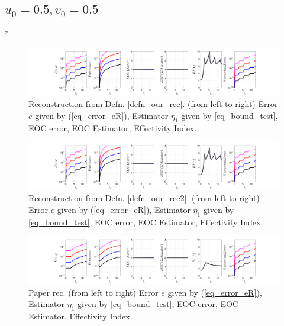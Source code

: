 \documentclass[12pt,a4paper]{article}
\numberwithin{equation}{section}
\theoremstyle{definition}
\begin{document}
\subsection*{$u_0=0.5, v_0= 0.5$}
\/*
\begin{figure}[H]
	\hspace{-3cm}
	\includegraphics[scale=0.55]{fig_LeapFrogplots_1x5_sin_IC_harmonic_order_2_u5_v5_rec_george}	
	\caption{Reconstruction from Defn. \ref{defn_our_rec}. (from left to right) Error $e$ given by (\ref{eq_error_eR}), Estimator $\eta_1$ given by \ref{eq_bound_test},   EOC error, EOC Estimator, Effectivity Index.}
	\label{fig_all_in_one_our_rec_george_u5_v5}
\end{figure}
\begin{figure}[H]
	\hspace{-3cm}
	\includegraphics[scale=0.55]{fig_LeapFrogplots_1x5_sin_IC_harmonic_order_2_u5_v5_rec2}	
	\caption{Reconstruction from Defn. \ref{defn_our_rec2}. (from left to right) Error $e$ given by (\ref{eq_error_eR}), Estimator $\eta_1$ given by \ref{eq_bound_test},  EOC error, EOC Estimator, Effectivity Index.}
	\label{fig_all_in_one_our_rec_2_u5_v5}
\end{figure}
\begin{figure}[H]
	\hspace{-3cm}
	\includegraphics[scale=0.55]{fig_LeapFrogplots_1x5_sin_IC_harmonic_u5_v5_paperrec}	
	\caption{Paper rec. (from left to right) Error $e$ given by (\ref{eq_error_eR}), Estimator $\eta_1$ given by \ref{eq_bound_test},   EOC error, EOC Estimator, Effectivity Index.}
	\label{fig_all_in_one_paperrec_u05_v05}
\end{figure}
\end{document}
